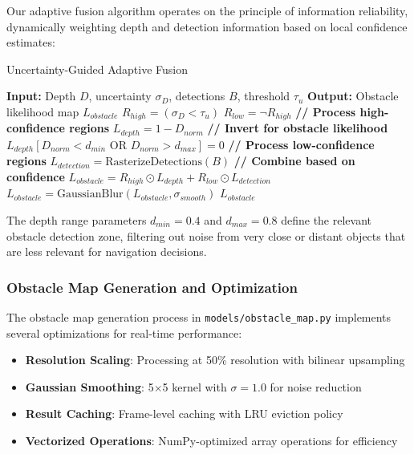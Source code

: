 \documentclass[12pt,oneside]{book}
\begin{document}
Our adaptive fusion algorithm operates on the principle of information reliability, dynamically weighting depth and detection information based on local confidence estimates:

\begin{algorithm}
\caption{Uncertainty-Guided Adaptive Fusion}
\begin{algorithmic}
\STATE \textbf{Input:} Depth $D$, uncertainty $\sigma_D$, detections $B$, threshold $\tau_u$
\STATE \textbf{Output:} Obstacle likelihood map $L_{obstacle}$
\STATE $R_{high} = (\sigma_D < \tau_u)$
\STATE $R_{low} = \neg R_{high}$
\STATE \textbf{// Process high-confidence regions}
\STATE $L_{depth} = 1 - D_{norm}$ \textbf{// Invert for obstacle likelihood}
\STATE $L_{depth}[D_{norm} < d_{min} \text{ OR } D_{norm} > d_{max}] = 0$
\STATE \textbf{// Process low-confidence regions}
\STATE $L_{detection} = \text{RasterizeDetections}(B)$
\STATE \textbf{// Combine based on confidence}
\STATE $L_{obstacle} = R_{high} \odot L_{depth} + R_{low} \odot L_{detection}$
\STATE $L_{obstacle} = \text{GaussianBlur}(L_{obstacle}, \sigma_{smooth})$
\RETURN $L_{obstacle}$
\end{algorithmic}
\end{algorithm}

The depth range parameters $d_{min} = 0.4$ and $d_{max} = 0.8$ define the relevant obstacle detection zone, filtering out noise from very close or distant objects that are less relevant for navigation decisions.

\subsubsection{Obstacle Map Generation and Optimization}

The obstacle map generation process in \texttt{models/obstacle\_map.py} implements several optimizations for real-time performance:

\begin{itemize}
\item \textbf{Resolution Scaling}: Processing at 50\% resolution with bilinear upsampling
\item \textbf{Gaussian Smoothing}: 5$\times$5 kernel with $\sigma = 1.0$ for noise reduction
\item \textbf{Result Caching}: Frame-level caching with LRU eviction policy
\item \textbf{Vectorized Operations}: NumPy-optimized array operations for efficiency
\end{itemize}
\end{document}
